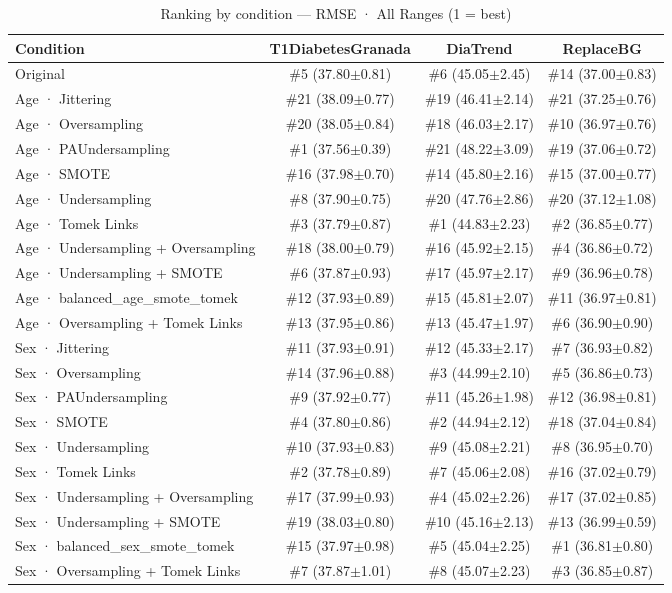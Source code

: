 \begin{table}[htbp]
\centering
\small
\caption{Ranking by condition — RMSE · All Ranges  (1 = best)}
\label{tab:ranking_rmse_entire}
\begin{tabular}{lccc}
\toprule
\textbf{Condition} & \textbf{T1DiabetesGranada} & \textbf{DiaTrend} & \textbf{ReplaceBG} \\
\midrule
Original & \#5 (37.80$\pm$0.81) & \#6 (45.05$\pm$2.45) & \#14 (37.00$\pm$0.83) \\
Age · Jittering & \#21 (38.09$\pm$0.77) & \#19 (46.41$\pm$2.14) & \#21 (37.25$\pm$0.76) \\
Age · Oversampling & \#20 (38.05$\pm$0.84) & \#18 (46.03$\pm$2.17) & \#10 (36.97$\pm$0.76) \\
Age · PAUndersampling & \#1 (37.56$\pm$0.39) & \#21 (48.22$\pm$3.09) & \#19 (37.06$\pm$0.72) \\
Age · SMOTE & \#16 (37.98$\pm$0.70) & \#14 (45.80$\pm$2.16) & \#15 (37.00$\pm$0.77) \\
Age · Undersampling & \#8 (37.90$\pm$0.75) & \#20 (47.76$\pm$2.86) & \#20 (37.12$\pm$1.08) \\
Age · Tomek Links & \#3 (37.79$\pm$0.87) & \#1 (44.83$\pm$2.23) & \#2 (36.85$\pm$0.77) \\
Age · Undersampling + Oversampling & \#18 (38.00$\pm$0.79) & \#16 (45.92$\pm$2.15) & \#4 (36.86$\pm$0.72) \\
Age · Undersampling + SMOTE & \#6 (37.87$\pm$0.93) & \#17 (45.97$\pm$2.17) & \#9 (36.96$\pm$0.78) \\
Age · balanced_age_smote_tomek & \#12 (37.93$\pm$0.89) & \#15 (45.81$\pm$2.07) & \#11 (36.97$\pm$0.81) \\
Age · Oversampling + Tomek Links & \#13 (37.95$\pm$0.86) & \#13 (45.47$\pm$1.97) & \#6 (36.90$\pm$0.90) \\
\midrule
Sex · Jittering & \#11 (37.93$\pm$0.91) & \#12 (45.33$\pm$2.17) & \#7 (36.93$\pm$0.82) \\
Sex · Oversampling & \#14 (37.96$\pm$0.88) & \#3 (44.99$\pm$2.10) & \#5 (36.86$\pm$0.73) \\
Sex · PAUndersampling & \#9 (37.92$\pm$0.77) & \#11 (45.26$\pm$1.98) & \#12 (36.98$\pm$0.81) \\
Sex · SMOTE & \#4 (37.80$\pm$0.86) & \#2 (44.94$\pm$2.12) & \#18 (37.04$\pm$0.84) \\
Sex · Undersampling & \#10 (37.93$\pm$0.83) & \#9 (45.08$\pm$2.21) & \#8 (36.95$\pm$0.70) \\
Sex · Tomek Links & \#2 (37.78$\pm$0.89) & \#7 (45.06$\pm$2.08) & \#16 (37.02$\pm$0.79) \\
Sex · Undersampling + Oversampling & \#17 (37.99$\pm$0.93) & \#4 (45.02$\pm$2.26) & \#17 (37.02$\pm$0.85) \\
Sex · Undersampling + SMOTE & \#19 (38.03$\pm$0.80) & \#10 (45.16$\pm$2.13) & \#13 (36.99$\pm$0.59) \\
Sex · balanced_sex_smote_tomek & \#15 (37.97$\pm$0.98) & \#5 (45.04$\pm$2.25) & \#1 (36.81$\pm$0.80) \\
Sex · Oversampling + Tomek Links & \#7 (37.87$\pm$1.01) & \#8 (45.07$\pm$2.23) & \#3 (36.85$\pm$0.87) \\
\bottomrule
\end{tabular}
\end{table}